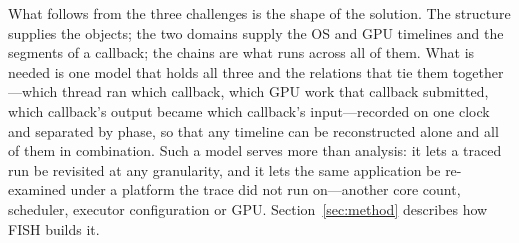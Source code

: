 What follows from the three challenges is the shape of the solution. The structure supplies the objects; the two domains supply the OS and GPU timelines and the segments of a callback; the chains are what runs across all of them. What is needed is one model that holds all three and the relations that tie them together---which thread ran which callback, which GPU work that callback submitted, which callback's output became which callback's input---recorded on one clock and separated by phase, so that any timeline can be reconstructed alone and all of them in combination. Such a model serves more than analysis: it lets a traced run be revisited at any granularity, and it lets the same application be re-examined under a platform the trace did not run on---another core count, scheduler, executor configuration or GPU. Section~\ref{sec:method} describes how FISH builds it.
